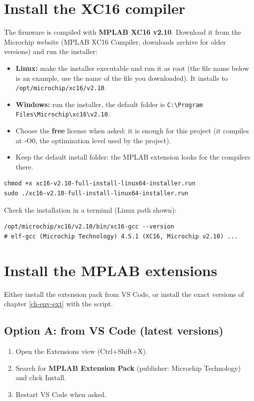 \documentclass[
  11pt,
  letterpaper,
  oneside,
  DIV=13,               %
  parskip=half,          %
  headings=normal,
  chapterprefix=false,
  toc=listof,
  numbers=noenddot,
]{scrbook}
\begin{document}
\section{Install the XC16 compiler}\label{sec-env-xc16}

The firmware is compiled with \textbf{MPLAB XC16 v2.10}. Download it from the Microchip website (MPLAB XC16 Compiler, downloads archive for older versions) and run the installer:
\begin{itemize}
\item \textbf{Linux:} make the installer executable and run it as root (the file name below is an example, use the name of the file you downloaded). It installs to \texttt{/\allowbreak{}opt/\allowbreak{}microchip/\allowbreak{}xc16/\allowbreak{}v2.\allowbreak{}10}.
\item \textbf{Windows:} run the installer, the default folder is \texttt{C:\textbackslash{}Program Files\textbackslash{}Microchip\textbackslash{}xc16\textbackslash{}v2.\allowbreak{}10}.
\item Choose the \textbf{free} license when asked: it is enough for this project (it compiles at -O0, the optimization level used by the project).
\item Keep the default install folder: the MPLAB extension looks for the compilers there.
\end{itemize}
\begin{lstlisting}[style=shell]
chmod +x xc16-v2.10-full-install-linux64-installer.run
sudo ./xc16-v2.10-full-install-linux64-installer.run
\end{lstlisting}

Check the installation in a terminal (Linux path shown):
\begin{lstlisting}[style=shell]
/opt/microchip/xc16/v2.10/bin/xc16-gcc --version
# elf-gcc (Microchip Technology) 4.5.1 (XC16, Microchip v2.10) ...
\end{lstlisting}

\section{Install the MPLAB extensions}\label{sec-env-ext}

Either install the extension pack from VS Code, or install the exact versions of chapter \ref{ch-env-ext} with the script.

\subsection{Option A: from VS Code (latest versions)}
\begin{enumerate}
\item Open the Extensions view (Ctrl+Shift+X).
\item Search for \textbf{MPLAB Extension Pack} (publisher: Microchip Technology) and click Install.
\item Restart VS Code when asked.
\end{enumerate}
\end{document}
